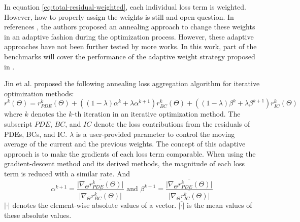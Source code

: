 In equation \eqref{eq:total-residual-weighted}, each individual loss term is weighted.
However, how to properly assign the weights is still and open question.
In references \cite{jin_nsfnets_2020,wang_understanding_2021}, the authors proposed an annealing approach to change these weights in an adaptive fashion during the optimization process.
However, these adaptive approaches have not been further tested by more works.
In this work, part of the benchmarks will cover the performance of the adaptive weight strategy proposed in \cite{jin_nsfnets_2020}.

Jin et al. \cite{jin_nsfnets_2020} proposed the following annealing loss aggregation algorithm for iterative optimization methods:
\begin{equation}
    r^k(\Theta) = r_{PDE}^k(\Theta) + 
        \left(\left(1-\lambda\right)\alpha^k + \lambda\alpha^{k+1}\right)r_{BC}^k(\Theta) + 
        \left(\left(1-\lambda\right)\beta^k + \lambda\beta^{k+1}\right)r_{IC}^k(\Theta)
\end{equation}
where $k$ denotes the $k$-th iteration in an iterative optimization method.
The subscript $PDE$, $BC$, and $IC$ denote the loss contributions from the residuals of PDEs, BCs, and IC.
$\lambda$ is a user-provided parameter to control the moving average of the current and the previous weights.
The concept of this adaptive approach is to make the gradients of each loss term comparable.
When using the gradient-descent method and its derived methods, the magnitude of each loss term is reduced with a similar rate.
And
\begin{equation}
    \alpha^{k+1} = \frac{\overline{\lvert\nabla_\Theta r_{PDE}^k(\Theta)\rvert}}{\overline{\lvert\nabla_\Theta r_{BC}^k(\Theta)\rvert}}
    \text{\ \ \ \ and\ \ \ \ }
    \beta^{k+1} = \frac{\overline{\lvert\nabla_\Theta r_{PDE}^k(\Theta)\rvert}}{\overline{\lvert\nabla_\Theta r_{IC}^k(\Theta)\rvert}}
\end{equation}
$\lvert\cdot\rvert$ denotes the element-wise absolute values of a vector.
$\overline{\lvert\cdot\rvert}$ is the mean values of these absolute values.

